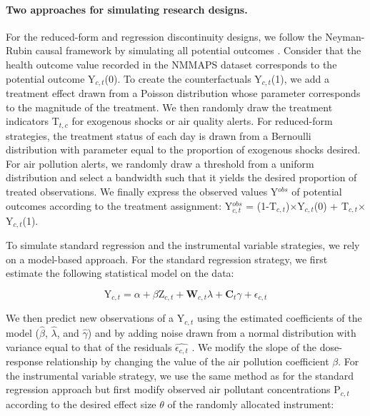 \documentclass[12pt]{article}
\begin{document}
        \paragraph{Two approaches for simulating research designs.}

        \begin{sloppypar}
        For the reduced-form and regression discontinuity designs, we follow the Neyman-Rubin causal framework by simulating all potential outcomes \citep{rubin_estimating_1974}. Consider that the health outcome value recorded in the NMMAPS dataset corresponds to the potential outcome Y$_{c,t}$(0). To create the counterfactuals Y$_{c,t}$(1), we add a treatment effect drawn from a Poisson distribution whose parameter corresponds to the magnitude of the treatment. We then randomly draw the treatment indicators T$_{t,c}$ for exogenous shocks or air quality alerts. For reduced-form strategies, the treatment status of each day is drawn from a Bernoulli distribution with parameter equal to the proportion of exogenous shocks desired. For air pollution alerts, we randomly draw a threshold from a uniform distribution and select a bandwidth such that it yields the desired proportion of treated observations. We finally express the observed values Y$^{obs}$ of potential outcomes according to the treatment assignment: Y$^{obs}_{c,t}$ = (1-T$_{c,t}$)$\times$Y$_{c,t}$(0) + T$_{c,t}$$\times$Y$_{c,t}$(1).
        \end{sloppypar}
      
        To simulate standard regression and the instrumental variable strategies, we rely on a model-based approach. For the standard regression strategy, we first estimate the following statistical model on the data:
        
        \begin{equation*}
        \text{Y}_{c,t} = \alpha + \beta\text{Z}_{c,t} + \textbf{W}_{c,t}\lambda + \textbf{C}_{t}\gamma + \epsilon_{c,t}
        \end{equation*}
        
        \noindent We then predict new observations of a $\text{Y}_{c,t}$ using the estimated coefficients of the model ($\hat{\beta}$, $\hat{\lambda}$, and $\hat{\gamma}$) and by adding noise drawn from a normal distribution with variance equal to that of the residuals $\widehat{\epsilon_{c,t}}$ \citep{peng2006model}. We modify the slope of the dose-response relationship by changing the value of the air pollution coefficient $\beta$. For the instrumental variable strategy, we use the same method as for the standard regression approach but first modify observed air pollutant concentrations $\text{P}_{c,t}$ according to the desired effect size $\theta$ of the randomly allocated instrument: 
        
\end{document}
